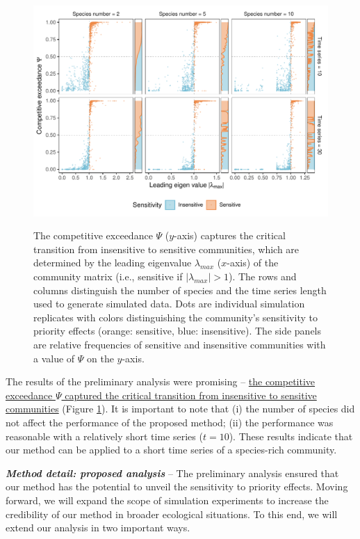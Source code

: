 \documentclass[12pt, class=article, crop=false]{standalone}
\begin{document}
\begin{figure}
    \caption{The competitive exceedance $\Psi$ ($y$-axis) captures the critical transition from insensitive to sensitive communities, which are determined by the leading eigenvalue $\lambda_{max}$ ($x$-axis) of the community matrix (i.e., sensitive if $|\lambda_{max}| > 1$).
    The rows and columns distinguish the number of species and the time series length used to generate simulated data.
    Dots are individual simulation replicates with colors distinguishing the community's sensitivity to priority effects (orange: sensitive, blue: insensitive).
    The side panels are relative frequencies of sensitive and insensitive communities with a value of $\Psi$ on the $y$-axis.}
    \includegraphics[scale=0.65]{output/figure_eigen_scatter.pdf}
    \label{fig:box}
\end{figure}

The results of the preliminary analysis were promising -- \ul{the competitive exceedance $\Psi$ captured the critical transition from insensitive to sensitive communities} (Figure \ref{fig:box}). It is important to note that (i) the number of species did not affect the performance of the proposed method; (ii) the performance was reasonable with a relatively short time series ($t = 10$).
These results indicate that our method can be applied to a short time series of a species-rich community. 

\textbf{\textit{Method detail: proposed analysis}} -- 
The preliminary analysis ensured that our method has the potential to unveil the sensitivity to priority effects.
Moving forward, we will expand the scope of simulation experiments to increase the credibility of our method in broader ecological situations.
To this end, we will extend our analysis in two important ways.
\end{document}
